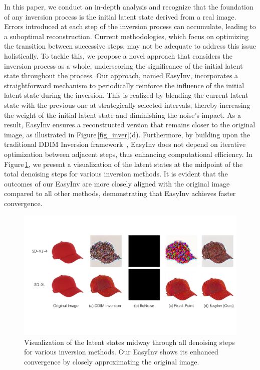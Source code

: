 \documentclass[letterpaper]{article} %
\begin{document}
In this paper, we conduct an in-depth analysis and recognize that the foundation of any inversion process is the initial latent state derived from a real image. Errors introduced at each step of the inversion process can accumulate, leading to a suboptimal reconstruction. Current methodologies, which focus on optimizing the transition between successive steps, may not be adequate to address this issue holistically. To tackle this, we propose a novel approach that considers the inversion process as a whole, underscoring the significance of the initial latent state throughout the process. Our approach, named EasyInv, incorporates a straightforward mechanism to periodically reinforce the influence of the initial latent state during the inversion. This is realized by blending the current latent state with the previous one at strategically selected intervals, thereby increasing the weight of the initial latent state and diminishing the noise's impact. As a result, EasyInv ensures a reconstructed version that remains closer to the original image, as illustrated in Figure\,\ref{fig_inver}(d). Furthermore, by building upon the traditional DDIM Inversion framework~\cite{couairon2023diffedit}, EasyInv does not depend on iterative optimization between adjacent steps, thus enhancing computational efficiency. In Figure\,\ref{fig_mid_step}, we present a visualization of the latent states at the midpoint of the total denoising steps for various inversion methods. It is evident that the outcomes of our EasyInv are more closely aligned with the original image compared to all other methods, demonstrating that EasyInv achieves faster convergence.




\begin{figure}[!t]
  \centering
  \includegraphics[width=0.98\linewidth]{visual_hat_noise_together_cut.pdf}
  \caption{Visualization of the latent states midway through all denoising steps for various inversion methods. Our EasyInv shows its enhanced convergence by closely approximating the original image.}
  \label{fig_mid_step}
\end{figure}
\end{document}
